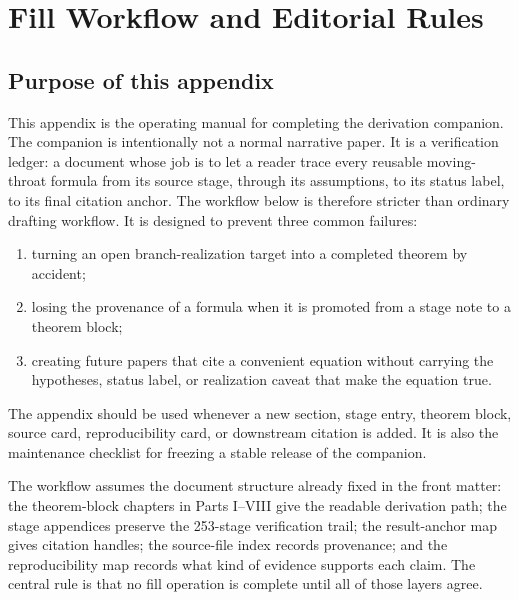 \chapter{Fill Workflow and Editorial Rules}
\label{app:fill-workflow}

\providecommand{\WorkflowFile}[1]{\begingroup\footnotesize\nolinkurl{#1}\endgroup}
\providecommand{\WorkflowGate}[1]{\textbf{#1}}

\section{Purpose of this appendix}
\label{sec:fill-workflow-purpose}

This appendix is the operating manual for completing the derivation companion.  The companion is intentionally not a normal narrative paper.  It is a verification ledger: a document whose job is to let a reader trace every reusable moving-throat formula from its source stage, through its assumptions, to its status label, to its final citation anchor.  The workflow below is therefore stricter than ordinary drafting workflow.  It is designed to prevent three common failures:

\begin{enumerate}[leftmargin=2.4em]
\item turning an open branch-realization target into a completed theorem by accident;
\item losing the provenance of a formula when it is promoted from a stage note to a theorem block;
\item creating future papers that cite a convenient equation without carrying the hypotheses, status label, or realization caveat that make the equation true.
\end{enumerate}

The appendix should be used whenever a new section, stage entry, theorem block, source card, reproducibility card, or downstream citation is added.  It is also the maintenance checklist for freezing a stable release of the companion.

The workflow assumes the document structure already fixed in the front matter: the theorem-block chapters in Parts I--VIII give the readable derivation path; the stage appendices preserve the 253-stage verification trail; the result-anchor map gives citation handles; the source-file index records provenance; and the reproducibility map records what kind of evidence supports each claim.  The central rule is that no fill operation is complete until all of those layers agree.

